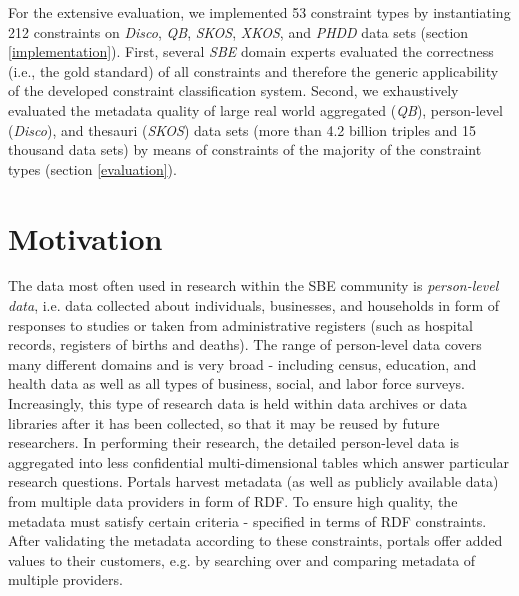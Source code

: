 \documentclass{llncs}
\begin{document}
For the extensive evaluation, we implemented 53 constraint types by instantiating 212 constraints on \emph{Disco}, \emph{QB}, \emph{SKOS}, \emph{XKOS}, and \emph{PHDD} data sets (section \ref{implementation}).
First, several \emph{SBE} domain experts evaluated the correctness (i.e., the gold standard) of all constraints and therefore the generic applicability of the developed constraint classification system. 
Second, we exhaustively evaluated the metadata quality of large real world aggregated (\emph{QB}), person-level (\emph{Disco}), and thesauri (\emph{SKOS}) data sets (more than 4.2 billion triples and 15 thousand data sets) by means of constraints of the majority of the constraint types (section \ref{evaluation}).

\section{Motivation}
\label{motivation}

The data most often used in research within the SBE community is \emph{person-level data}, i.e. data collected about individuals, businesses, and households in form of responses to studies or taken from administrative registers
(such as hospital records, registers of births and deaths). 
The range of person-level data covers many different domains and is very broad - 
including census, education, and health data as well as all types of business, social, and labor force surveys.  
Increasingly, this type of research data is
held within data archives or data libraries after it has been collected, so that it may be
reused by future researchers. 
In performing their research, the detailed person-level
data is aggregated into less confidential multi-dimensional tables which answer particular research questions.
Portals harvest metadata (as well as publicly available data) from multiple data providers in form of RDF.
To ensure high quality, the metadata must satisfy certain criteria - specified in terms of RDF constraints.  
After validating the metadata according to these constraints, portals offer added values to their customers, e.g. by searching over and comparing metadata of multiple providers. 
\end{document}

